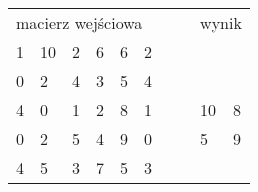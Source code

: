 \begin{table}[h]
\centering
\caption[Short Heading]{}
\begin{tabular}{llllllllll}
\multicolumn{6}{l}{macierz wejściowa}                                                                                                                                                                                                                                                                 &  &                       & \multicolumn{2}{l}{wynik}                                                                        \\ \cline{1-6}
\multicolumn{1}{|l|}{\cellcolor[HTML]{CBCEFB}1} & \multicolumn{1}{l|}{\cellcolor[HTML]{CBCEFB}10} & \multicolumn{1}{l|}{\cellcolor[HTML]{CBCEFB}2} & \multicolumn{1}{l|}{\cellcolor[HTML]{FFFE65}6} & \multicolumn{1}{l|}{\cellcolor[HTML]{FFFE65}6} & \multicolumn{1}{l|}{\cellcolor[HTML]{FFFE65}2} &  &                       &                                                 &                                                \\ \cline{1-6}
\multicolumn{1}{|l|}{\cellcolor[HTML]{CBCEFB}0} & \multicolumn{1}{l|}{\cellcolor[HTML]{CBCEFB}2}  & \multicolumn{1}{l|}{\cellcolor[HTML]{CBCEFB}4} & \multicolumn{1}{l|}{\cellcolor[HTML]{FFFE65}3} & \multicolumn{1}{l|}{\cellcolor[HTML]{FFFE65}5} & \multicolumn{1}{l|}{\cellcolor[HTML]{FFFE65}4} &  &                       &                                                 &                                                \\ \cline{1-6} \cline{9-10} 
\multicolumn{1}{|l|}{\cellcolor[HTML]{CBCEFB}4} & \multicolumn{1}{l|}{\cellcolor[HTML]{CBCEFB}0}  & \multicolumn{1}{l|}{\cellcolor[HTML]{CBCEFB}1} & \multicolumn{1}{l|}{\cellcolor[HTML]{FFFE65}2} & \multicolumn{1}{l|}{\cellcolor[HTML]{FFFE65}8} & \multicolumn{1}{l|}{\cellcolor[HTML]{FFFE65}1} &  & \multicolumn{1}{l|}{} & \multicolumn{1}{l|}{\cellcolor[HTML]{CBCEFB}10} & \multicolumn{1}{l|}{\cellcolor[HTML]{FCFF2F}8} \\ \cline{1-6} \cline{9-10} 
\multicolumn{1}{|l|}{\cellcolor[HTML]{FFCB2F}0} & \multicolumn{1}{l|}{\cellcolor[HTML]{FFCB2F}2}  & \multicolumn{1}{l|}{\cellcolor[HTML]{FFCB2F}5} & \multicolumn{1}{l|}{\cellcolor[HTML]{32CB00}4} & \multicolumn{1}{l|}{\cellcolor[HTML]{32CB00}9} & \multicolumn{1}{l|}{\cellcolor[HTML]{32CB00}0} &  & \multicolumn{1}{l|}{} & \multicolumn{1}{l|}{\cellcolor[HTML]{FFC702}5}  & \multicolumn{1}{l|}{\cellcolor[HTML]{32CB00}9} \\ \cline{1-6} \cline{9-10} 
\multicolumn{1}{|l|}{\cellcolor[HTML]{FFCB2F}4} & \multicolumn{1}{l|}{\cellcolor[HTML]{FFCB2F}5}  & \multicolumn{1}{l|}{\cellcolor[HTML]{FFCB2F}3} & \multicolumn{1}{l|}{\cellcolor[HTML]{32CB00}7} & \multicolumn{1}{l|}{\cellcolor[HTML]{32CB00}5} & \multicolumn{1}{l|}{\cellcolor[HTML]{32CB00}3} &  &                       &                                                 &                                                \\ \cline{1-6}

\end{tabular}
\end{table}
